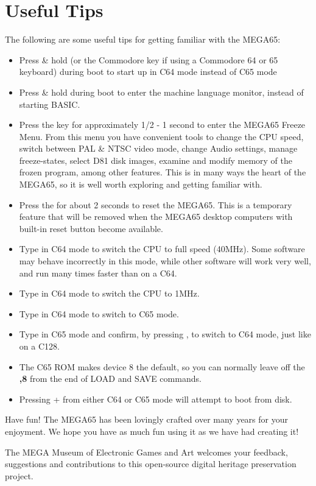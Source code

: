 \section{Useful Tips}

The following are some useful tips for getting familiar with the MEGA65:

\begin{itemize}

\item{Press \& hold \megasymbolkey (or the Commodore key if using a Commodore 64 or 65 keyboard) during boot to start up in C64 mode instead of C65 mode}
 \item{Press \& hold  during boot to enter the machine language monitor, instead of starting BASIC.}
\item{Press the  key for approximately 1/2 - 1 second to enter the MEGA65 Freeze Menu.  From this menu
  you have convenient tools to change the CPU speed, switch between PAL \& NTSC video mode, change Audio settings, manage freeze-states,
   select D81 disk images, examine and modify memory of the frozen program, among other features.  This is in many ways the heart of the MEGA65, so it is well worth exploring and getting familiar with.}
\item{Press the  for about 2 seconds to reset the MEGA65.  This is a temporary feature that will be removed when the MEGA65 desktop computers with built-in reset button become available.}
\item{Type  in C64 mode to switch  the CPU to full speed (40MHz). Some software may behave incorrectly in this mode, while other software will work very well, and run many times faster than on a C64.}
\item{Type  in C64 mode to switch the CPU to 1MHz.}
\item{Type  in C64 mode to switch to C65 mode.}
\item{Type  in C65 mode and confirm, by pressing , to switch to C64 mode, just like on a C128.}
\item{The C65 ROM makes device 8 the default, so you can normally leave off the \textbf{,8} from the end of LOAD and SAVE commands.}
\item{Pressing  +  from either C64 or C65 mode will attempt to boot from disk.}
\end{itemize}

Have fun! The MEGA65 has been lovingly crafted over many years for your enjoyment. We hope you have as much fun using it as we have had creating it!

The MEGA Museum of Electronic Games and Art welcomes your feedback, suggestions and contributions to this open-source digital heritage preservation project.
